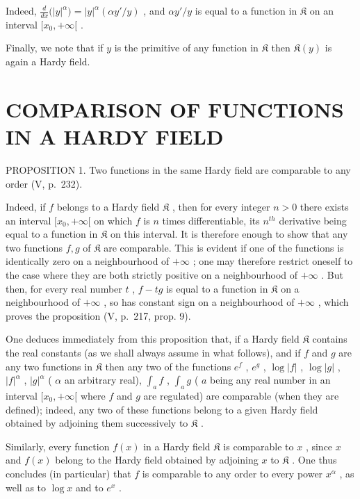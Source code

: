 Indeed, \(\frac{d}{dx}\big(|y|^{\alpha}\big) = |y|^{\alpha}(\alpha y'/y)\) , and \(\alpha y'/y\) is equal to a function in \(\mathfrak{K}\) on an interval \([x_0, +\infty[\) .

Finally, we note that if \(y\) is the primitive of any function in \(\mathfrak{K}\) then \(\mathfrak{K}(y)\) is again a Hardy field.

\section{COMPARISON OF FUNCTIONS IN A HARDY FIELD}

PROPOSITION 1. Two functions in the same Hardy field are comparable to any order (V, p.~232).

Indeed, if \(f\) belongs to a Hardy field \(\mathfrak{K}\) , then for every integer \(n > 0\) there exists an interval \([x_0, +\infty[\) on which \(f\) is \(n\) times differentiable, its \(n^{th}\) derivative being equal to a function in \(\mathfrak{K}\) on this interval. It is therefore enough to show that any two functions \(f, g\) of \(\mathfrak{K}\) are comparable. This is evident if one of the functions is identically zero on a neighbourhood of \(+\infty\) ; one may therefore restrict oneself to the case where they are both strictly positive on a neighbourhood of \(+\infty\) . But then, for every real number \(t\) , \(f - tg\) is equal to a function in \(\mathfrak{K}\) on a neighbourhood of \(+\infty\) , so has constant sign on a neighbourhood of \(+\infty\) , which proves the proposition (V, p.~217, prop. 9).

One deduces immediately from this proposition that, if a Hardy field \(\mathfrak{K}\) contains the real constants (as we shall always assume in what follows), and if \(f\) and \(g\) are any two functions in \(\mathfrak{K}\) then any two of the functions \(e^f\) , \(e^g\) , \(\log |f|\) , \(\log |g|\) , \(|f|^{\alpha}\) , \(|g|^{\alpha}\) ( \(\alpha\) an arbitrary real), \(\int_{a} f\) , \(\int_{a} g\) ( \(a\) being any real number in an interval \([x_0, +\infty[\) where \(f\) and \(g\) are regulated) are comparable (when they are defined); indeed, any two of these functions belong to a given Hardy field obtained by adjoining them successively to \(\mathfrak{K}\) .

Similarly, every function \(f(x)\) in a Hardy field \(\mathfrak{K}\) is comparable to \(x\) , since \(x\) and \(f(x)\) belong to the Hardy field obtained by adjoining \(x\) to \(\mathfrak{K}\) . One thus concludes (in particular) that \(f\) is comparable to any order to every power \(x^{\alpha}\) , as well as to \(\log x\) and to \(e^{x}\) .


